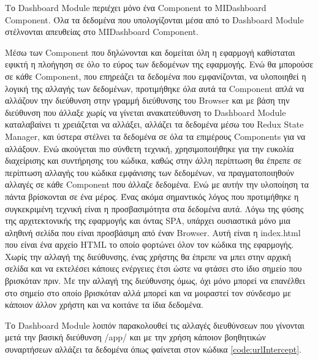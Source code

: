 Το Dashboard Module περιέχει μόνο ένα Component το ΜΙDashboard Component. Όλα τα δεδομένα που υπολογίζονται μέσα από το Dashboard Module στέλνονται απευθείας στο ΜΙDashboard Component.

Μέσω των Component που δηλώνονται και δομείται όλη η εφαρμογή καθίσταται εφικτή η πλοήγηση σε όλο το εύρος των δεδομένων της εφαρμογής. Ενώ θα μπορούσε σε κάθε Component, που επηρεάζει τα δεδομένα που εμφανίζονται, να υλοποιηθεί η λογική της αλλαγής των δεδομένων, προτιμήθηκε όλα αυτά τα Component απλά να αλλάζουν την διεύθυνση στην γραμμή διεύθυνσης του Browser και με βάση την διεύθυνση που άλλαξε χωρίς να γίνεται ανακατεύθυνση το Dashboard Module καταλαβαίνει τι χρειάζεται να αλλάξει, αλλάζει τα δεδομένα μέσω του Redux State Manager, και ύστερα στέλνει τα δεδομένα σε όλα τα επιμέρους Components για να αλλάξουν. Ενώ ακούγεται πιο σύνθετη τεχνική, χρησιμοποιήθηκε για την ευκολία διαχείρισης και συντήρησης του κώδικα, καθώς στην άλλη περίπτωση θα έπρεπε σε περίπτωση αλλαγής του κώδικα εμφάνισης των δεδομένων, να πραγματοποιηθούν αλλαγές σε κάθε Component που άλλαζε δεδομένα. Ενώ με αυτήν την υλοποίηση τα πάντα βρίσκονται σε ένα μέρος. Ένας ακόμα σημαντικός λόγος που προτιμήθηκε η συγκεκριμένη τεχνική είναι η προσβασιμότητα στα δεδομένα αυτά. Λόγω της φύσης της αρχιτεκτονικής της εφαρμογής και όντας SPA, υπάρχει ουσιαστικά μόνο μια αληθινή σελίδα που είναι προσβάσιμη από έναν Browser. Αυτή είναι η index.html που είναι ένα αρχείο HTML το οποίο φορτώνει όλον τον κώδικα της εφαρμογής. Χωρίς την αλλαγή της διεύθυνσης, ένας χρήστης θα έπρεπε να μπει στην αρχική σελίδα και να εκτελέσει κάποιες ενέργειες έτσι ώστε να φτάσει στο ίδιο σημείο που βρισκόταν πριν. Με την αλλαγή της διεύθυνσης όμως, όχι μόνο μπορεί να επανέλθει στο σημείο στο οποίο βρισκόταν αλλά μπορεί και να μοιραστεί τον σύνδεσμο με κάποιον άλλον χρήστη και να κοιτάνε τα ίδια δεδομένα. 

Το Dashboard Module λοιπόν παρακολουθεί τις αλλαγές διευθύνσεων που γίνονται μετά την βασική διεύθυνση /app/ και με την χρήση κάποιον βοηθητικών συναρτήσεων αλλάζει τα δεδομένα όπως φαίνεται στον κώδικα \ref{code:urlIntercept}.

